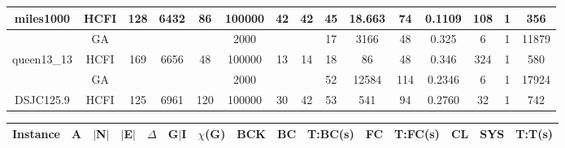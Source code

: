 \documentclass[10pt]{article}
\begin{document}
\begin{center}
\begin{table}[H]
\begin{tabular}{|c|c|c|c|c|c|c|c|c|c|c|c|c|c|c|}
 \multirow{-2}{*}{miles1000} &HCFI   &\multirow{-2}{*}{128}   &\multirow{-2}{*}{6432}     &\multirow{-2}{*}{86}     &100000     &\multirow{-2}{*}{\cellcolor{yellow}42}      & \multirow{-2}{*}{\cellcolor{yellow}42}    &{\cellcolor{green}45}     &18.663         &74    &0.1109         &108    &1     &356        \\ \hline \hline
	&GA&       &                   &                     &    2000     &     \cellcolor{yellow} & {\cellcolor{yellow}}& {{\cellcolor{green}17}}
&3166   &48        &0.325                   &6                    &1          & 11879       \\ \cline{2-2} \cline{6-6} \cline{9-15}
 \multirow{-2}{*}{queen13\_13} &HCFI   &\multirow{-2}{*}{169}   &\multirow{-2}{*}{6656}     &\multirow{-2}{*}{48}     &100000     &\multirow{-2}{*}{\cellcolor{yellow}13}      & \multirow{-2}{*}{\cellcolor{yellow}14}    &{\cellcolor{green}18}     &86         &48    &0.346         &324    &1     &580       \\ \hline  \hline
	&GA&       &                   &                     &    2000     &     \cellcolor{yellow} & {\cellcolor{yellow}}& {{\cellcolor{green}52}}
&12584   &114        &0.2346                   &6                    &1          &17924        \\ \cline{2-2} \cline{6-6} \cline{9-15}
 \multirow{-2}{*}{DSJC125.9} &HCFI   &\multirow{-2}{*}{125}   &\multirow{-2}{*}{6961}     &\multirow{-2}{*}{120}     &100000     &\multirow{-2}{*}{\cellcolor{yellow}30}      & \multirow{-2}{*}{\cellcolor{yellow}42}    &{\cellcolor{green}53}     &541         &94    &0.2760         &32    &1     &742        \\ \hline 


\end{tabular}
\end{table}

\begin{table}[H]
\begin{tabular}{|c|c|c|c|c|c|c|c|c|c|c|c|c|c|c|}
\hline
Instance& A &$|$N$|$ & $|$E$|$ & $\Delta$ & G$|$I & $\chi$(G) &BCK&BC & T:BC(s) & FC & T:FC(s) & CL & SYS & T:T(s) \\ \hline \hline


\end{tabular}
\end{table}
\end{center}
\end{document}
